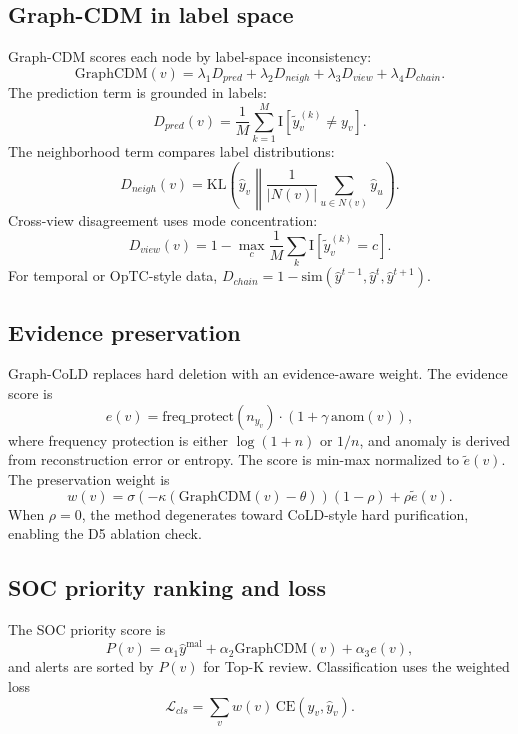\documentclass[11pt]{article}
\newcommand{\gcdm}{\mathrm{GraphCDM}}
\newcommand{\ypred}{\hat{y}}
\newcommand{\ynoise}{\tilde{y}}
\newcommand{\mal}{\mathrm{mal}}
\begin{document}
\subsection{Graph-CDM in label space}
Graph-CDM scores each node by label-space inconsistency:
\begin{equation}
\gcdm(v)=\lambda_1D_{pred}+\lambda_2D_{neigh}+\lambda_3D_{view}+\lambda_4D_{chain}.
\end{equation}
The prediction term is grounded in labels:
\begin{equation}
D_{pred}(v)=\frac{1}{M}\sum_{k=1}^{M}\mathrm{I}[\ynoise_v^{(k)}\neq y_v].
\end{equation}
The neighborhood term compares label distributions:
\begin{equation}
D_{neigh}(v)=\mathrm{KL}\left(\ypred_v\middle\|\frac{1}{|N(v)|}\sum_{u\in N(v)}\ypred_u\right).
\end{equation}
Cross-view disagreement uses mode concentration:
\begin{equation}
D_{view}(v)=1-\max_c\frac{1}{M}\sum_k\mathrm{I}[\ynoise_v^{(k)}=c].
\end{equation}
For temporal or OpTC-style data, $D_{chain}=1-\mathrm{sim}(\ypred^{t-1},\ypred^t,\ypred^{t+1})$.

\subsection{Evidence preservation}
Graph-CoLD replaces hard deletion with an evidence-aware weight. The evidence score is
\begin{equation}
e(v)=\mathrm{freq\_protect}(n_{y_v})\cdot (1+\gamma\,\mathrm{anom}(v)),
\end{equation}
where frequency protection is either $\log(1+n)$ or $1/n$, and anomaly is derived from reconstruction error or entropy. The score is min-max normalized to $\tilde{e}(v)$. The preservation weight is
\begin{equation}
w(v)=\sigma(-\kappa(\gcdm(v)-\theta))(1-\rho)+\rho\tilde{e}(v).
\end{equation}
When $\rho=0$, the method degenerates toward CoLD-style hard purification, enabling the D5 ablation check.

\subsection{SOC priority ranking and loss}
The SOC priority score is
\begin{equation}
P(v)=\alpha_1\ypred^\mal+\alpha_2\gcdm(v)+\alpha_3e(v),
\end{equation}
and alerts are sorted by $P(v)$ for Top-K review. Classification uses the weighted loss
\begin{equation}
\mathcal{L}_{cls}=\sum_v w(v)\,\mathrm{CE}(y_v,\ypred_v).
\end{equation}
\end{document}
